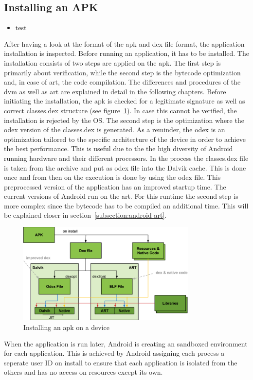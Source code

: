 \subsection{Installing an APK} \label{subsection:android-install}
\begin{itemize}
    \item test
\end{itemize}
After having a look at the format of the \gls{apk} and \gls{dex} file format, the application installation is inspected.
Before running an application, it has to be installed.
The installation consists of two steps are applied on the \gls{apk}.
The first step is primarily about verification, while the second step is the bytecode optimization and, in case of \gls{art}, the code compilation.
The differences and procedures of the \gls{dvm} as well as \gls{art} are explained in detail in the following chapters.
Before initiating the installation, the \gls{apk} is checked for a legitimate signature as well as correct classes.dex structure (see figure~\ref{fig:install}).
In case this cannot be verified, the installation is rejected by the OS.
The second step is the optimization where the \gls{odex} version of the classes.dex is generated.
As a reminder, the \gls{odex} is an optimization tailored to the specific architecture of the device in order to achieve the best performance.
This is useful due to the the high diversity of Android running hardware and their different processors.
In the process the classes.dex file is taken from the archive and put as \gls{odex} file into the Dalvik cache.
This is done once and from then on the execution is done by using the \gls{odex} file.
This preprocessed version of the application has an improved startup time. \cite{kovachevaMaster}
The current versions of Android run on the \gls{art}.
For this runtime the second step is more complex since the bytecode has to be compiled an additional time.
This will be explained closer in section~\ref{subsection:android-art}.
\newline
\begin{figure}[h]
    \centering
    \includegraphics[width=0.8\textwidth]{data/install.png}
    \caption{Installing an \gls{apk} on a device \cite{googleIOArt}}
    \label{fig:install}
\end{figure}

When the application is run later, Android is creating an sandboxed environment for each application.
This is achieved by Android assigning each process a seperate user ID on install to ensure that each application is isolated from the others and has no access on resources except its own. \cite{developerFundamentals}
